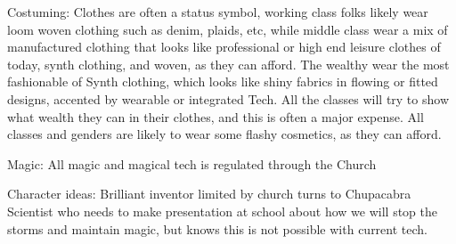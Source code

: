 \documentclass[blue]{GL2020}
\begin{document}
Costuming:		Clothes are often a status symbol, working class folks likely wear loom woven clothing such as denim, plaids, etc, while middle class wear a mix of manufactured clothing that looks like professional or high end leisure clothes of today, synth clothing, and woven, as they can afford.  The wealthy wear the most fashionable of Synth clothing, which looks like shiny fabrics in flowing or fitted designs, accented by wearable or integrated Tech.  All the classes will try to show what wealth they can in their clothes, and this is often a major expense.  All classes and genders are likely to wear some flashy cosmetics, as they can afford.

Magic:	All magic and magical tech is regulated through the Church

Character ideas:  Brilliant inventor limited by church turns to Chupacabra
									Scientist who needs to make presentation at school about how we will stop the storms and
										maintain magic, but knows this is not possible with current tech.
									
\end{document}
